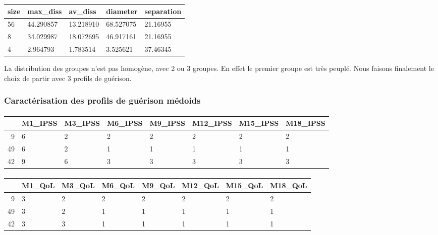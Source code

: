 \documentclass[11pt]{article}
\begin{document}
\bigbreak

    \begin{tabular}{lllll}
 size & max\_diss & av\_diss & diameter & separation\\
\hline
	 56        & 44.290857 & 13.218910 & 68.527075 & 21.16955 \\
	  8        & 34.029987 & 18.072695 & 46.917161 & 21.16955 \\
	  4        &  2.964793 &  1.783514 &  3.525621 & 37.46345 \\
\end{tabular}

\bigbreak
    
    \begin{center}
    \end{center}
    
    
    La distribution des groupes n'est pas homogène, avec 2 ou 3 groupes. En
effet le premier groupe est très peuplé.
\medbreak
Nous faisons finalement le choix de partir avec 3 profils de guérison.

    \subsubsection{Caractérisation des profils de guérison
médoids}\label{caractuxe9risation-des-profils-de-guuxe9rison-muxe9doids}


\paragraph{}
    \begin{tabular}{r|lllllll}
  & M1\_IPSS & M3\_IPSS & M6\_IPSS & M9\_IPSS & M12\_IPSS & M15\_IPSS & M18\_IPSS\\
\hline
	9 & 6 & 2 & 2 & 2 & 2 & 2 & 2\\
	49 & 6 & 2 & 1 & 1 & 1 & 1 & 1\\
	42 & 9 & 6 & 3 & 3 & 3 & 3 & 3\\
\end{tabular}

\paragraph{}
    
    \begin{tabular}{r|lllllll}
  & M1\_QoL & M3\_QoL & M6\_QoL & M9\_QoL & M12\_QoL & M15\_QoL & M18\_QoL\\
\hline
	9 & 3 & 2 & 2 & 2 & 2 & 2 & 2\\
	49 & 3 & 2 & 1 & 1 & 1 & 1 & 1\\
	42 & 3 & 3 & 1 & 1 & 1 & 1 & 1\\
\end{tabular}
\end{document}
